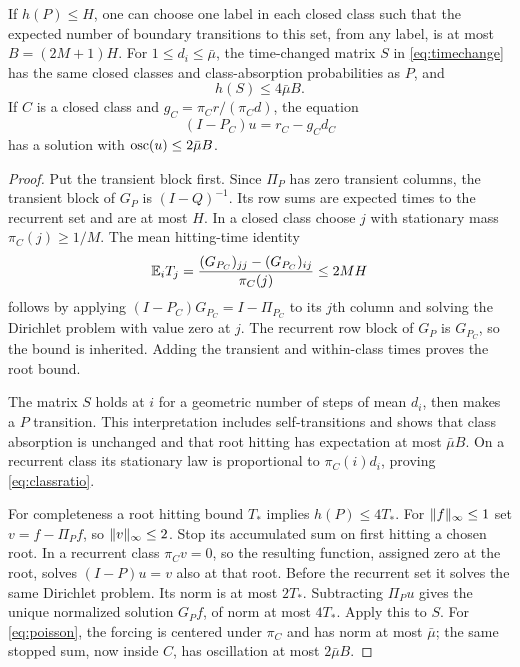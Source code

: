 \begin{lemma}\label{lem:roots}
If $h(P)\le H$, one can choose one label in each closed class such that the expected number of boundary transitions to this set, from any label, is at most
$B=(2M+1)H$. For $1\le d_i\le\bar\mu$, the time-changed matrix $S$ in \eqref{eq:timechange} has the same closed classes and class-absorption probabilities as $P$, and
\begin{equation}\label{eq:timegroup}
 h(S)\le4\bar\mu B.
\end{equation}
If $C$ is a closed class and $g_C=\pi_Cr/(\pi_Cd)$, the equation
\begin{equation}\label{eq:poisson}
 (I-P_C)u=r_C-g_Cd_C
\end{equation}
has a solution with $\operatorname{osc}(u)\le2\bar\mu B$.
\end{lemma}
\begin{proof}
Put the transient block first. Since $\Pi_P$ has zero transient columns, the transient block of $G_P$ is $(I-Q)^{-1}$. Its row sums are expected times to the recurrent set and are at most $H$. In a closed class choose $j$ with stationary mass $\pi_C(j)\ge1/M$. The mean hitting-time identity
\[
 \mathbb E_i T_j={(G_{P_C})_{jj}-(G_{P_C})_{ij}\over\pi_C(j)}
 \le2MH
\]
follows by applying $(I-P_C)G_{P_C}=I-\Pi_{P_C}$ to its $j$th column and solving the Dirichlet problem with value zero at $j$. The recurrent row block of $G_P$ is $G_{P_C}$, so the bound is inherited. Adding the transient and within-class times proves the root bound.

The matrix $S$ holds at $i$ for a geometric number of steps of mean $d_i$, then makes a $P$ transition. This interpretation includes self-transitions and shows that class absorption is unchanged and that root hitting has expectation at most $\bar\mu B$. On a recurrent class its stationary law is proportional to $\pi_C(i)d_i$, proving \eqref{eq:classratio}.

For completeness a root hitting bound $T_*$ implies $h(P)\le4T_*$. For $\lVert f\rVert_\infty\le1$ set $v=f-\Pi_P f$, so $\lVert v\rVert_\infty\le2$. Stop its accumulated sum on first hitting a chosen root. In a recurrent class $\pi_Cv=0$, so the resulting function, assigned zero at the root, solves $(I-P)u=v$ also at that root. Before the recurrent set it solves the same Dirichlet problem. Its norm is at most $2T_*$. Subtracting $\Pi_Pu$ gives the unique normalized solution $G_Pf$, of norm at most $4T_*$. Apply this to $S$. For \eqref{eq:poisson}, the forcing is centered under $\pi_C$ and has norm at most $\bar\mu$; the same stopped sum, now inside $C$, has oscillation at most $2\bar\mu B$.
\end{proof}

